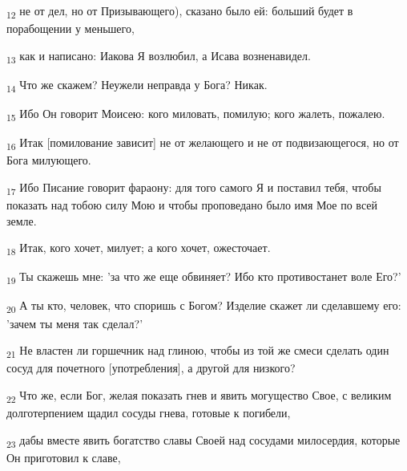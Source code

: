 \begin{tcolorbox}
\textsubscript{12} не от дел, но от Призывающего), сказано было ей: больший будет в порабощении у меньшего,
\end{tcolorbox}
\begin{tcolorbox}
\textsubscript{13} как и написано: Иакова Я возлюбил, а Исава возненавидел.
\end{tcolorbox}
\begin{tcolorbox}
\textsubscript{14} Что же скажем? Неужели неправда у Бога? Никак.
\end{tcolorbox}
\begin{tcolorbox}
\textsubscript{15} Ибо Он говорит Моисею: кого миловать, помилую; кого жалеть, пожалею.
\end{tcolorbox}
\begin{tcolorbox}
\textsubscript{16} Итак [помилование зависит] не от желающего и не от подвизающегося, но от Бога милующего.
\end{tcolorbox}
\begin{tcolorbox}
\textsubscript{17} Ибо Писание говорит фараону: для того самого Я и поставил тебя, чтобы показать над тобою силу Мою и чтобы проповедано было имя Мое по всей земле.
\end{tcolorbox}
\begin{tcolorbox}
\textsubscript{18} Итак, кого хочет, милует; а кого хочет, ожесточает.
\end{tcolorbox}
\begin{tcolorbox}
\textsubscript{19} Ты скажешь мне: 'за что же еще обвиняет? Ибо кто противостанет воле Его?'
\end{tcolorbox}
\begin{tcolorbox}
\textsubscript{20} А ты кто, человек, что споришь с Богом? Изделие скажет ли сделавшему его: 'зачем ты меня так сделал?'
\end{tcolorbox}
\begin{tcolorbox}
\textsubscript{21} Не властен ли горшечник над глиною, чтобы из той же смеси сделать один сосуд для почетного [употребления], а другой для низкого?
\end{tcolorbox}
\begin{tcolorbox}
\textsubscript{22} Что же, если Бог, желая показать гнев и явить могущество Свое, с великим долготерпением щадил сосуды гнева, готовые к погибели,
\end{tcolorbox}
\begin{tcolorbox}
\textsubscript{23} дабы вместе явить богатство славы Своей над сосудами милосердия, которые Он приготовил к славе,
\end{tcolorbox}
